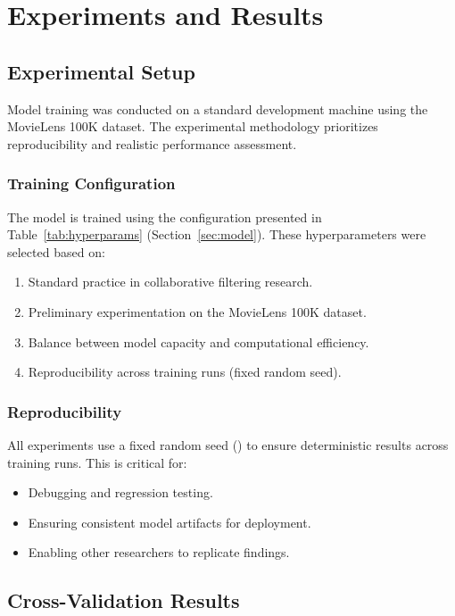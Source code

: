 \section{Experiments and Results}
\label{sec:experiments}

\subsection{Experimental Setup}

Model training was conducted on a standard development machine using the MovieLens 100K dataset. 
The experimental methodology prioritizes reproducibility and realistic performance assessment.

\subsubsection{Training Configuration}

The model is trained using the configuration presented in Table~\ref{tab:hyperparams} (Section~\ref{sec:model}). 
These hyperparameters were selected based on:

\begin{enumerate}
  \item Standard practice in collaborative filtering research.
  \item Preliminary experimentation on the MovieLens 100K dataset.
  \item Balance between model capacity and computational efficiency.
  \item Reproducibility across training runs (fixed random seed).
\end{enumerate}

\subsubsection{Reproducibility}

All experiments use a fixed random seed () to ensure deterministic results across 
training runs. This is critical for:

\begin{itemize}
  \item Debugging and regression testing.
  \item Ensuring consistent model artifacts for deployment.
  \item Enabling other researchers to replicate findings.
\end{itemize}

\subsection{Cross-Validation Results}

